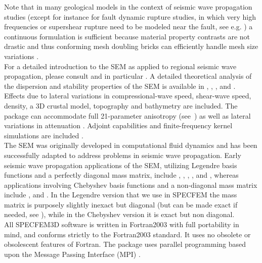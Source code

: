 Note that in many geological models in the context of seismic wave
propagation studies (except for instance for fault dynamic rupture
studies, in which very high frequencies or supershear rupture need
to be modeled near the fault, see e.g. \citet{BeGlCrViPi07,BeGlCrVi09,PuAmKa09,TaCrEtViBeSa10})
a continuous formulation is sufficient because material property contrasts
are not drastic and thus conforming mesh doubling bricks can efficiently
handle mesh size variations \citep{KoTr02a,KoLiTrSuStSh04,LeChLiKoHuTr08,LeChKoHuTr09,LeKoHuTr09}.\\


For a detailed introduction to the SEM as applied to regional seismic
wave propagation, please consult \citet{PeKoLuMaLeCaLeMaLiBlNiBaTr11,TrKoLi08,KoVi98,KoTr99,ChKoViCaVaFe07}
and in particular \citet{LeKoHuTr09,LeChKoHuTr09,LeChLiKoHuTr08,GoAmTaCaSmSaMaKo09,WiKoScTr04,KoLiTrSuStSh04}.
A detailed theoretical analysis of the dispersion
and stability properties of the SEM is available in \citet{Coh02}, \citet{DeSe07}, \citet{SeOl07}, \citet{SeOl08} and \citet{MeStTh12}.\\


Effects due to lateral variations in compressional-wave speed, shear-wave
speed, density, a 3D crustal model, topography and bathymetry are
included. The package can accommodate full 21-parameter anisotropy
(see~\citet{ChTr07}) as well as lateral variations in attenuation
\citep{SaKoTr10}. Adjoint capabilities and finite-frequency kernel
simulations are included \citep{TrKoLi08,PeKoLuMaLeCaLeMaLiBlNiBaTr11,LiTr06,FiIgBuKe09,ViOp09}.\\


The SEM was originally developed in computational fluid dynamics \citep{Pat84,MaPa89}
and has been successfully adapted to address problems in seismic wave
propagation. Early seismic wave propagation applications of the SEM,
utilizing Legendre basis functions and a perfectly diagonal mass matrix,
include \citet{CoJoTo93}, \citet{Kom97}, \citet{FaMaPaQu97}, \citet{CaGa97},
\citet{KoVi98} and \citet{KoTr99}, whereas applications involving
Chebyshev basis functions and a non-diagonal mass matrix include \citet{SePr94},
\citet{PrCaSe94} and \citet{SePrPr95}.
In the Legendre version that we use in SPECFEM the mass matrix is purposely slightly inexact but diagonal (but can be made exact if needed, see \cite{Teu15}),
while in the Chebyshev version it is exact but non diagonal.\\


All SPECFEM3D software is written in Fortran2003 with full portability
in mind, and conforms strictly to the Fortran2003 standard. It uses
no obsolete or obsolescent features of Fortran. The package uses parallel
programming based upon the Message Passing Interface (MPI) \citep{GrLuSk94,Pac97}.\\


